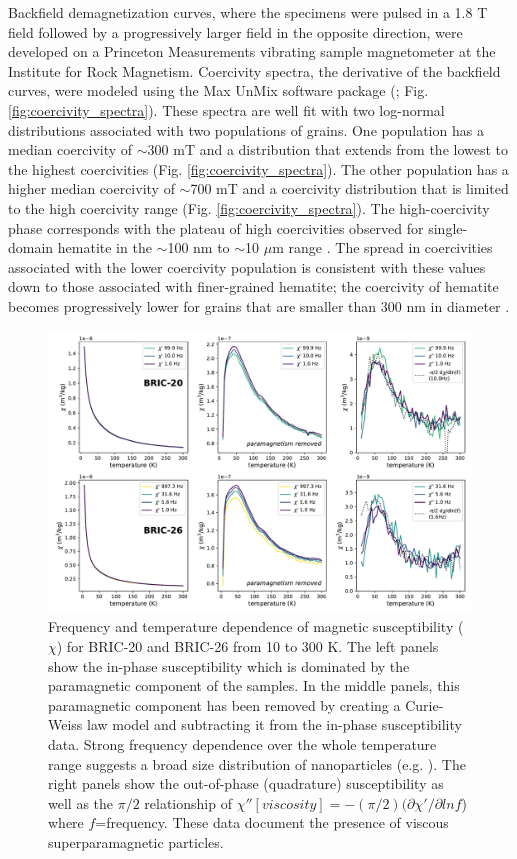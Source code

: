 \documentclass[draft]{agujournal2018}
\begin{document}
Backfield demagnetization curves, where the specimens were pulsed in a 1.8 T field followed by a progressively larger field in the opposite direction, were developed on a Princeton Measurements vibrating sample magnetometer at the Institute for Rock Magnetism. Coercivity spectra, the derivative of the backfield curves, were modeled using the Max UnMix software package (\citealp{Maxbauer2016a}; Fig. \ref{fig:coercivity_spectra}). These spectra are well fit with two log-normal distributions associated with two populations of grains. One population has a median coercivity of $\sim$300 mT and a distribution that extends from the lowest to the highest coercivities (Fig. \ref{fig:coercivity_spectra}). The other population has a higher median coercivity of $\sim$700 mT and a coercivity distribution that is limited to the high coercivity range (Fig. \ref{fig:coercivity_spectra}). The high-coercivity phase corresponds with the plateau of high coercivities observed for single-domain hematite in the $\sim$100 nm to $\sim$10 $\mu$m range \citep{Ozdemir2014a}. The spread in coercivities associated with the lower coercivity population is consistent with these values down to those associated with finer-grained hematite; the coercivity of hematite becomes progressively lower for grains that are smaller than 300 nm in diameter \citep{Ozdemir2014a}.

\begin{figure}[!ht]
\noindent\includegraphics[width=\textwidth]{figures/low_temp_ac}
\caption{\small{Frequency and temperature dependence of magnetic susceptibility ($\chi$) for BRIC-20 and BRIC-26 from 10 to 300 K. The left panels show the in-phase susceptibility which is dominated by the paramagnetic component of the samples. In the middle panels, this paramagnetic component has been removed by creating a Curie-Weiss law model and subtracting it from the in-phase susceptibility data. Strong frequency dependence over the whole temperature range suggests a broad size distribution of nanoparticles (e.g. \citealp{Jackson2012a}). The right panels show the out-of-phase (quadrature) susceptibility as well as the $\pi/2$ relationship of $\chi''[viscosity] = -(\pi/2)(\partial \chi'/\partial lnf$) where $f$=frequency. These data document the presence of viscous superparamagnetic particles.}}
\label{fig:low_temp_ac}
\end{figure}
\end{document}
